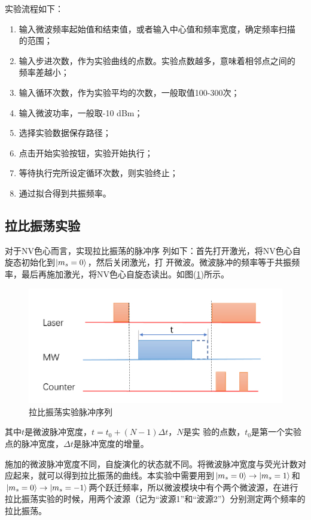 \documentclass[a4paper]{article}
\begin{document}
实验流程如下：
\begin{enumerate}
	\item 输入微波频率起始值和结束值，或者输入中心值和频率宽度，确定频率扫描
	的范围；
	\item 输入步进次数，作为实验曲线的点数。实验点数越多，意味着相邻点之间的
	频率差越小；
	\item 输入循环次数，作为实验平均的次数，一般取值100-300次；
	\item 输入微波功率，一般取-10 dBm；
	\item 选择实验数据保存路径；
	\item 点击开始实验按钮，实验开始执行；
	\item 等待执行完所设定循环次数，则实验终止；
	\item 通过拟合得到共振频率。
\end{enumerate}


\subsection{拉比振荡实验}
对于NV色心而言，实现拉比振荡的脉冲序
列如下：首先打开激光，将NV色心自旋态初始化到$ \ket{m_s=0} $，然后关闭激光，打
开微波。微波脉冲的频率等于共振频率，最后再施加激光，将NV色心自旋态读出。如图(\ref{fig:rabip})所示。
\begin{figure}[H]
	\centering
	\includegraphics[width=0.7\linewidth]{fig/rabipulse.jpg}
	\caption{拉比振荡实验脉冲序列}
	\label{fig:rabip}
\end{figure}
其中$ t  $是微波脉冲宽度，$ t = t_0 + (N - 1)\Delta t $，$ N $是实
验的点数，$ t_0  $是第一个实验点的脉冲宽度，$ \Delta t  $是脉冲宽度的增量。

施加的微波脉冲宽度不同，自旋演化的状态就不同。将微波脉冲宽度与荧光计数对
应起来，就可以得到拉比振荡的曲线。本实验中需要用到$ \ket{m_s=0} \rightarrow \ket{m_s=1} $和$ \ket{m_s=0} \rightarrow \ket{m_s=-1} $两个跃迁频率，所以微波模块中有个两个微波源，在进行拉比振荡实验的时候，用两个波源（记为“波源1”和“波源2”）分别测定两个频率的拉比振荡。
\end{document}

